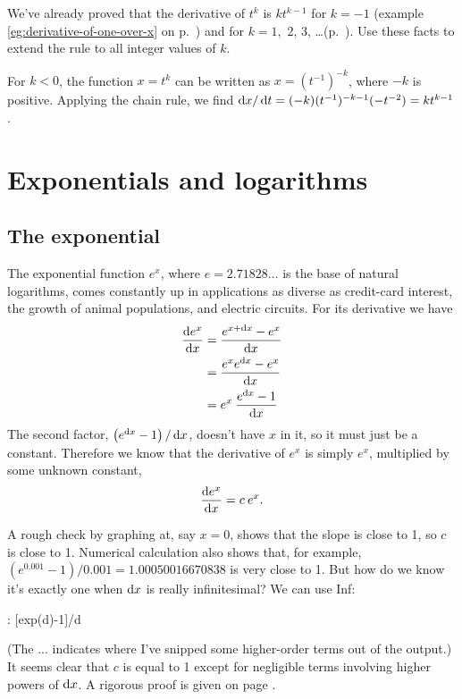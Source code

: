 \begin{eg}\label{eg:derive-neg-integer-power}
\egquestion We've already proved that the derivative of $t^k$ is $kt^{k-1}$ for $k=-1$
(example \ref{eg:derivative-of-one-over-x} on p.~\pageref{eg:derivative-of-one-over-x})
and for $k=1,$ 2, 3, \ldots (p.~\pageref{detour:polynomial-proof}). Use these facts to extend
the rule to all integer values of $k$.

\eganswer
For $k<0$, the function $x=t^k$ can be written as $x=(t^{-1})^{-k}$, where $-k$ is positive.
Applying the chain rule, we find $\operatorname{d\!} x/\operatorname{d\!} t=(-k)(t^{-1})^{-k-1}(-t^{-2})=kt^{k-1}$.
\end{eg}

\section{Exponentials and logarithms}

\subsection{The exponential}
The exponential function $e^x$, where $e=2.71828\ldots$ is the base of natural
logarithms, comes constantly up in applications as diverse as credit-card interest, the growth of
animal populations, and electric circuits. For its derivative we have
\begin{align*}
  \frac{\der e^x}{\der x} &= \frac{e^{x+\der x}-e^x}{\der x} \\
                          &= \frac{e^x e^{\der x}-e^x}{\der x} \\
                          &= e^x \: \frac{e^{\der x}-1}{\der x}
\end{align*}
The second factor, $\left(e^{\operatorname{d\!} x}-1\right)/\operatorname{d\!} x$, doesn't have $x$ in it, so it
must just be a constant. Therefore we know that the derivative of $e^x$ is simply
$e^x$, multiplied by some unknown constant,
\begin{equation*}
  \frac{\operatorname{d\!} e^x}{\operatorname{d\!} x} = c\:e^x .
\end{equation*}

A rough check by graphing at, say $x=0$, shows that the slope is close to 1, so $c$ is close to
1. Numerical calculation also shows that, for example, $(e^{0.001}-1)/0.001=1.00050016670838$ is very close
to 1. But how do we know it's exactly one when $\operatorname{d\!} x$ is really infinitesimal?
We can use Inf:
\begin{Code}
  \ii : [exp(d)-1]/d
\end{Code}
(The ... indicates where I've snipped some higher-order terms out of the output.) It seems clear
that $c$ is equal to 1 except for negligible terms involving higher powers of $\operatorname{d\!} x$.
A rigorous proof is given on page \pageref{detour:exp}.\label{main:exp}

